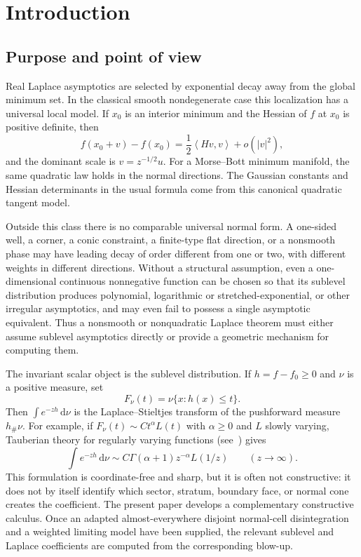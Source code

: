 \documentclass[11pt]{amsart}
\numberwithin{equation}{section}
\theoremstyle{definition}
\theoremstyle{remark}
\newcommand{\dd}{\,\mathrm{d}}
\newcommand{\inner}[2]{\left\langle #1,#2\right\rangle}
\begin{document}
\section{Introduction}

\subsection*{Purpose and point of view}

Real Laplace asymptotics are selected by exponential decay away from the global
minimum set.  In the classical smooth nondegenerate case this localization has a
universal local model.  If $x_0$ is an interior minimum and the Hessian of $f$ at
$x_0$ is positive definite, then
\begin{equation}\label{eq:intro-quadratic-model}
  f(x_0+v)-f(x_0)=\frac12\inner{Hv}{v}+o(|v|^2),
\end{equation}
and the dominant scale is $v=z^{-1/2}u$.  For a Morse--Bott minimum manifold,
the same quadratic law holds in the normal directions.  The Gaussian constants
and Hessian determinants in the usual formula come from this canonical
quadratic tangent model.

Outside this class there is no comparable universal normal form.  A one-sided
well, a corner, a conic constraint, a finite-type flat direction, or a nonsmooth
phase may have leading decay of order different from one or two, with different
weights in different directions.  Without a structural assumption, even a
one-dimensional continuous nonnegative function can be chosen so that its
sublevel distribution produces polynomial, logarithmic or stretched-exponential, 
or other irregular asymptotics, and may even fail to possess a single
asymptotic equivalent.  Thus a nonsmooth or nonquadratic Laplace theorem must
either assume sublevel asymptotics directly or provide a geometric mechanism
for computing them.

The invariant scalar object is the sublevel distribution.  If $h=f-f_0\ge0$ and
$\nu$ is a positive measure, set
\begin{equation*}
  F_\nu(t)=\nu\{x:h(x)\le t\}.
\end{equation*}
Then $\int e^{-zh}\dd\nu$ is the Laplace--Stieltjes transform of the pushforward
measure $h_\#\nu$.  For example, if $F_\nu(t)\sim C t^\alpha L(t)$ with $\alpha\ge0$
and $L$ slowly varying, Tauberian theory for regularly varying functions
(see~\cite{BinghamGoldieTeugels}) gives
\begin{equation*}
  \int e^{-zh}\dd\nu
  \sim C\Gamma(\alpha+1)z^{-\alpha}L(1/z)
  \qquad (z\to\infty).
\end{equation*}
This formulation is coordinate-free and sharp,
but it is often not constructive: it does not by itself identify which sector,
stratum, boundary face, or normal cone creates the coefficient.  The present
paper develops a complementary constructive calculus.  Once an adapted
almost-everywhere disjoint normal-cell disintegration and a weighted limiting
model have been supplied, the relevant sublevel and Laplace coefficients are
computed from the corresponding blow-up.
\end{document}
